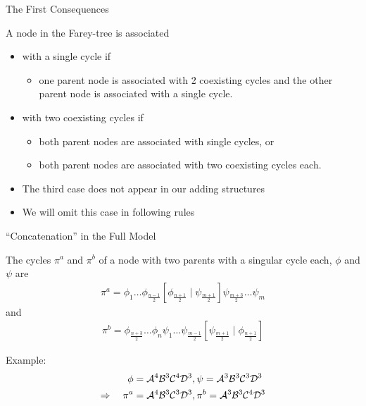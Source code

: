 \begin{frame}{The First Consequences}
	\vspace{-1em}
	\begin{theorem}
		A node in the Farey-tree is associated
		\begin{itemize}
			\item with a single cycle if
			      \begin{itemize}
				      \item one parent node is associated with 2 coexisting cycles and the other parent node is associated with a single cycle.
			      \end{itemize}
			      \pause
			\item with two coexisting cycles if
			      \begin{itemize}
				      \item both parent nodes are associated with single cycles, or
				      \item both parent nodes are associated with two coexisting cycles each.
			      \end{itemize}
		\end{itemize}
	\end{theorem}
	\pause
	\begin{itemize}
		\item The third case does not appear in our adding structures
		\item We will omit this case in following rules
	\end{itemize}
\end{frame}

\begin{frame}{``Concatenation'' in the Full Model}
	\vspace{-1em}
	\begin{theorem}
		The cycles $\pi^a$ and $\pi^b$ of a node with two parents with a singular cycle each, $\phi$ and $\psi$ are
		\begin{align*}
			\pi^a = \phi_1 \dots \phi_{\frac{n-1}{2}} \left[\phi_{\frac{n+1}{2}} \mid \psi_{\frac{m+1}{2}}\right] \psi_{\frac{m+3}{2}} \dots \psi_m
		\end{align*}
		and
		\begin{align*}
			\pi^b =  \phi_{\frac{n+3}{2}} \dots \phi_n \psi_1 \dots \psi_{\frac{m-1}{2}} \left[\psi_{\frac{m+1}{2}} \mid \phi_{\frac{n+1}{2}}\right]
		\end{align*}
	\end{theorem}
	\pause
	Example: \vspace{-2em} \begin{align*}
		\phi                    & = \mathcal{A}^4\mathcal{B}^3\mathcal{C}^4\mathcal{D}^3, \psi = \mathcal{A}^3\mathcal{B}^3\mathcal{C}^3\mathcal{D}^3  \\
		\Rightarrow \quad \pi^a & = \mathcal{A}^4\mathcal{B}^3\mathcal{C}^3\mathcal{D}^3, \pi^b = \mathcal{A}^3\mathcal{B}^3\mathcal{C}^4\mathcal{D}^3
	\end{align*}
\end{frame}

